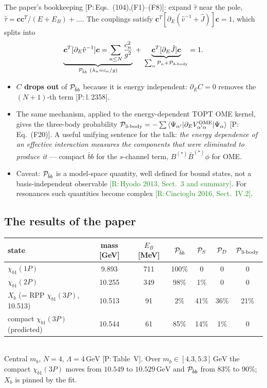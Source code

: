 \documentclass[11pt,a4paper]{article}
\newcommand{\tagP}[1]{\textcolor{blue!65!black}{\textsf{\small[P:\,#1]}}}
\newcommand{\tagR}[1]{\textcolor{ForestGreen}{\textsf{\small[R:\,#1]}}}
\newcommand{\Pbb}{{\cal P}_{\bar bb}}
\renewcommand{\GeV}{\,\mathrm{GeV}}
\begin{document}
The paper's bookkeeping \tagP{Eqs.~(104),(F1)--(F8)}: expand $\hat\tau$ near the pole, $\hat\tau=\bm c\bm c^T/(E+E_B)+\dots$. The couplings satisfy $\bm c^T[\partial_E(\hat v^{-1}+\hat J)]\bm c=1$, which splits into
\begin{equation}
\underbrace{\bm c^T[\partial_E\hat v^{-1}]\bm c=\sum_{n\le N}\frac{c_n^2}{g^2}}_{\Pbb\ (\lambda_n=c_n/g)}\;+\;\underbrace{\bm c^T[\partial_E\hat J]\bm c}_{\sum_\alpha{\cal P}_\alpha+{\cal P}_{3\text{-body}}}=1 .
\end{equation}
\begin{itemize}
\item \textbf{$C$ drops out} of $\Pbb$ because it is energy independent: $\partial_EC=0$ removes the $(N+1)$-th term \tagP{l.\,2358}.
\item The same mechanism, applied to the energy-dependent TOPT OME kernel, gives the three-body probability ${\cal P}_{3\text{-body}}=-\sum\braket{\Psi_{\alpha'}|\partial_EV^{\rm OME}_{\alpha'\alpha}|\Psi_\alpha}$ \tagP{Eq.~(F20)}. A useful unifying sentence for the talk: \emph{the energy dependence of an effective interaction measures the components that were eliminated to produce it} --- compact $\bar bb$ for the $s$-channel term, $B^{(*)}\bar B^{(*)}\phi$ for OME.
\item Caveat: $\Pbb$ is a model-space quantity, well defined for bound states, not a basis-independent observable \tagR{Hyodo 2013, Sect.~3 and summary}. For resonances such quantities become complex \tagR{Cincioglu 2016, Sect.~IV.2}.
\end{itemize}

\subsection{The results of the paper}

\begin{center}
\small
\begin{tabular}{lcccccc}
\toprule
state & mass [GeV] & $E_B$ [MeV] & $\Pbb$ & ${\cal P}_S$ & ${\cal P}_D$ & ${\cal P}_{3\text{-body}}$\\
\midrule
$\chi_{b1}(1P)$ & 9.893 & 711 & 100\% & 0 & 0 & 0\\
$\chi_{b1}(2P)$ & 10.255 & 349 & 98\% & 1\% & 0 & 0\\
$X_b$ (= RPP $\chi_{b1}(3P)$, 10.513) & 10.513 & 91 & 2\% & 41\% & 36\% & 21\%\\
compact $\chi_{b1}(3P)$ (predicted) & 10.544 & 61 & 85\% & 14\% & 1\% & 0\\
\bottomrule
\end{tabular}\\[2pt]
{\footnotesize Central $m_b$, $N=4$, $\Lambda=4\GeV$ \tagP{Table~V}. Over $m_b\in[4.3,5.3]\GeV$ the compact $\chi_{b1}(3P)$ moves from $10.549$ to $10.529\GeV$ and $\Pbb$ from 83\% to 90\%; $X_b$ is pinned by the fit.}
\end{center}
\end{document}
